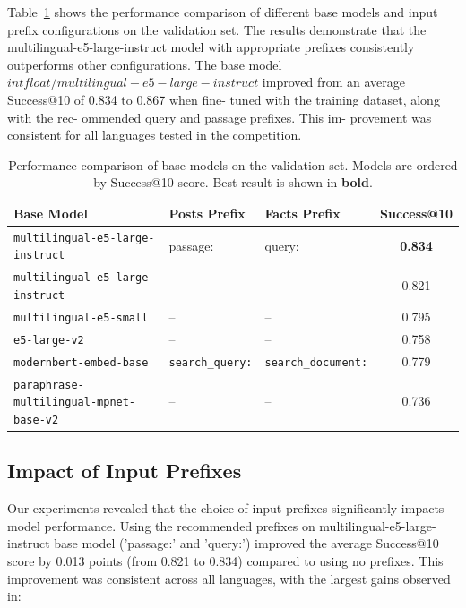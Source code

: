 \documentclass[11pt]{article}
\begin{document}
Table~\ref{tab:base-models} shows the performance comparison of different base models and input prefix configurations on the validation set. The results demonstrate that the multilingual-e5-large-instruct model with appropriate prefixes consistently outperforms other configurations.
The base model $intfloat/multilingual-e5-large-
instruct$ \cite{wang2024multilingual} improved from an
average Success@10 of 0.834 to 0.867 when fine-
tuned with the training dataset, along with the rec-
ommended query and passage prefixes. This im-
provement was consistent for all languages tested
in the competition.
\begin{table}[t]
  \centering
  \small
  \begin{tabular}{p{5cm}p{3cm}p{3cm}c}
    \hline
    \textbf{Base Model} & \textbf{Posts Prefix} & \textbf{Facts Prefix} & \textbf{Success@10} \\
    \hline
    \texttt{multilingual-e5-large-instruct} \cite{wang2024multilingual} & passage: & query: & \textbf{0.834} \\
    \texttt{multilingual-e5-large-instruct} \cite{wang2024multilingual} & -- & -- & 0.821 \\
    \texttt{multilingual-e5-small} \cite{wang2024multilingual} & -- & -- & 0.795 \\
    \texttt{e5-large-v2} \cite{wang2022text} & -- & -- & 0.758 \\
    \texttt{modernbert-embed-base} \cite{nussbaum2024nomic} & \texttt{search\_query:} & \texttt{search\_document:} & 0.779 \\
    \texttt{paraphrase-multilingual-mpnet-base-v2} \cite{reimers2019sentence} & -- & -- & 0.736 \\
    \hline
  \end{tabular}
  \caption{Performance comparison of base models on the validation set. Models are ordered by Success@10 score. Best result is shown in \textbf{bold}.}
  \label{tab:base-models}
\end{table}

\subsection{Impact of Input Prefixes}

Our experiments revealed that the choice of input prefixes significantly impacts model performance. Using the recommended prefixes on multilingual-e5-large-instruct base model ('passage:' and 'query:') improved the average Success@10 score by 0.013 points (from 0.821 to 0.834) compared to using no prefixes. This improvement was consistent across all languages, with the largest gains observed in:
\end{document}
